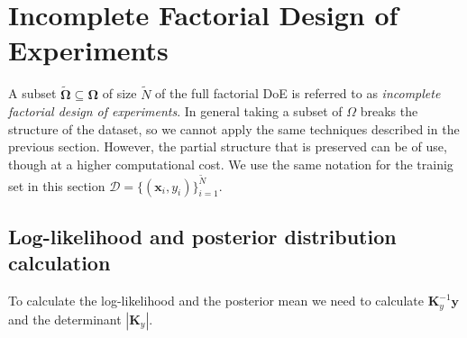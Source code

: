 \section{Incomplete Factorial Design of Experiments}

A subset $\boldsymbol{\widetilde{\Omega}} \subseteq \boldsymbol{\Omega}$ of size
$\widetilde{N}$ of the full factorial DoE
is referred to as {\em incomplete factorial design of experiments}.
In general taking a subset of $\Omega$ breaks the structure of the dataset,
so we cannot apply the same techniques described in the previous section.
However, the partial structure that is preserved can be of use,
though at a higher computational cost.
We use the same notation for the trainig set in this section
$\mathcal{D} = \{(\mathbf{x}_i, y_i)\}_{i=1}^{\widetilde{N}}$.

\subsection{Log-likelihood and posterior distribution calculation}

To calculate the log-likelihood and the posterior mean we need to calculate
$\mathbf{K}_y^{-1}\mathbf{y}$ and the determinant $|\mathbf{K}_y|$.

